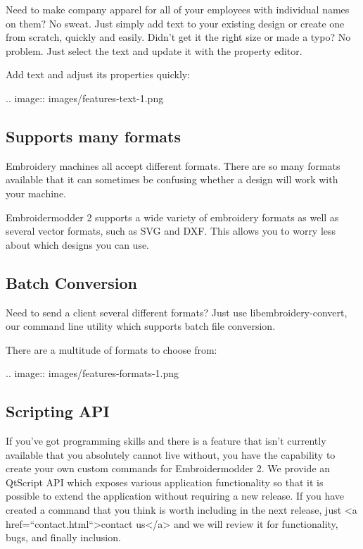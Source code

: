 \documentclass[11pt]{report}
\begin{document}
Need to make company apparel for all of your employees with individual names on them? No sweat. Just simply add text to your existing design or create one from scratch, quickly and easily.
Didn't get it the right size or made a typo? No problem. Just select the text and update it with the property editor.

Add text and adjust its properties quickly:

.. image::
   images/features-text-1.png

\subsection{Supports many formats}

Embroidery machines all accept different formats. There are so many formats available that it can sometimes be confusing whether a design will work with your machine.

Embroidermodder 2 supports a wide variety of embroidery formats as well as several vector formats, such as SVG and DXF. This allows you to worry less about which designs you can use.

\subsection{Batch Conversion}

Need to send a client several different formats? Just use libembroidery-convert, our command line utility which supports batch file conversion.

There are a multitude of formats to choose from:

.. image::
   images/features-formats-1.png

\subsection{Scripting API}

If you've got programming skills and there is a feature that isn't currently available that you absolutely cannot live without, you have the capability to create your own custom commands for Embroidermodder 2. We provide an QtScript API which exposes various application functionality so that it is possible to extend the application without requiring a new release. If you have created a command that you think is worth including in the next release, just <a href=``contact.html``>contact us</a> and we will review it for functionality, bugs, and finally inclusion.
\end{document}
